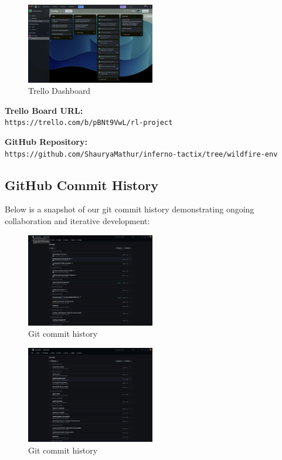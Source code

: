 \documentclass[conference]{IEEEtran}
\begin{document}
\begin{figure}[H]
    \centering
    \includegraphics[width=0.5\textwidth]{trello_rl.png}
    \caption{Trello Dashboard}
    \end{figure}

\vspace{-0.3cm}
\noindent\textbf{Trello Board URL:} \\
\texttt{https://trello.com/b/pBNt9VwL/rl-project}

\vspace{0.3cm}
\noindent\textbf{GitHub Repository:} \\
\texttt{https://github.com/ShauryaMathur/inferno-tactix/tree/wildfire-env}

\subsection{GitHub Commit History}
\hspace{-0.4cm}Below is a snapshot of our git commit history demonstrating ongoing collaboration and iterative development:

\begin{figure}[H]
\centering
\includegraphics[width=0.5\textwidth]{git1.png}
\caption{Git commit history}
\end{figure}

\begin{figure}[H]
    \centering
    \includegraphics[width=0.5\textwidth]{git2.png}
    \caption{Git commit history}
    \end{figure}
\end{document}

